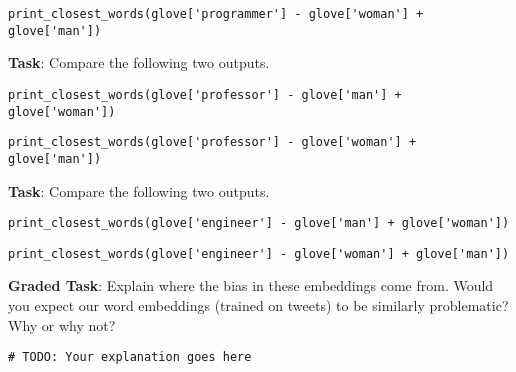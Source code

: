 \documentclass[
  letterpaper,
  DIV=11,
  numbers=noendperiod]{scrartcl}
\begin{document}
\begin{verbatim}
print_closest_words(glove['programmer'] - glove['woman'] + glove['man'])
\end{verbatim}

\textbf{Task}: Compare the following two outputs.

\begin{verbatim}
print_closest_words(glove['professor'] - glove['man'] + glove['woman'])
\end{verbatim}

\begin{verbatim}
print_closest_words(glove['professor'] - glove['woman'] + glove['man'])
\end{verbatim}

\textbf{Task}: Compare the following two outputs.

\begin{verbatim}
print_closest_words(glove['engineer'] - glove['man'] + glove['woman'])
\end{verbatim}

\begin{verbatim}
print_closest_words(glove['engineer'] - glove['woman'] + glove['man'])
\end{verbatim}

\textbf{Graded Task}: Explain where the bias in these embeddings come
from. Would you expect our word embeddings (trained on tweets) to be
similarly problematic? Why or why not?

\begin{verbatim}
# TODO: Your explanation goes here
\end{verbatim}
\end{document}
